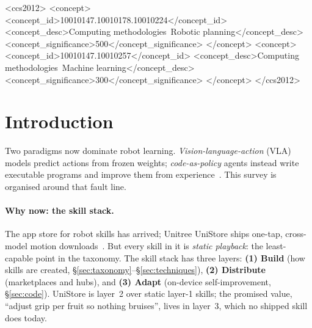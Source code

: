 \documentclass[acmsmall,screen,nonacm]{acmart}
\begin{document}
\begin{CCSXML}
<ccs2012>
   <concept>
       <concept_id>10010147.10010178.10010224</concept_id>
       <concept_desc>Computing methodologies~Robotic planning</concept_desc>
       <concept_significance>500</concept_significance>
   </concept>
   <concept>
       <concept_id>10010147.10010257</concept_id>
       <concept_desc>Computing methodologies~Machine learning</concept_desc>
       <concept_significance>300</concept_significance>
   </concept>
</ccs2012>
\end{CCSXML}


\maketitle

%
\section{Introduction}
\label{sec:intro}

Two paradigms now dominate robot learning. \emph{Vision-language-action} (VLA)
models predict actions from frozen weights; \emph{code-as-policy} agents instead
write executable programs and improve them from experience~\citep{codeaspolicies,aspire}.
This survey is organised around that fault line.

\paragraph{Why now: the skill stack.}
The app store for robot skills has arrived; Unitree UniStore ships one-tap,
cross-model motion downloads~\citep{unistore2026}. But every skill in it is
\emph{static playback}: the least-capable point in the taxonomy. The skill stack has
three layers: \textbf{(1) Build} (how skills are created, \S\ref{sec:taxonomy}--\S\ref{sec:techniques}),
\textbf{(2) Distribute} (marketplaces and hubs), and \textbf{(3) Adapt} (on-device
self-improvement, \S\ref{sec:code}). UniStore is layer~2 over static layer-1 skills;
the promised value, ``adjust grip per fruit so nothing bruises'', lives in layer~3,
which no shipped skill does today.
\end{document}
